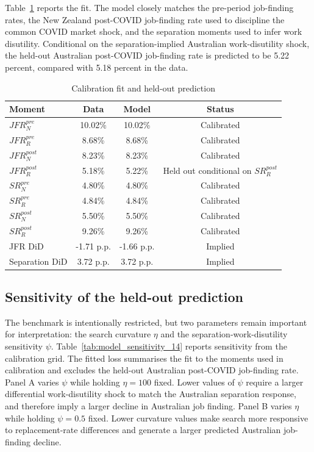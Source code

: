 Table~\ref{tab:model_fit_14} reports the fit. The model closely matches the pre-period job-finding rates, the New Zealand post-COVID job-finding rate used to discipline the common COVID market shock, and the separation moments used to infer work disutility. Conditional on the separation-implied Australian work-disutility shock, the held-out Australian post-COVID job-finding rate is predicted to be 5.22 percent, compared with 5.18 percent in the data.

\begin{table}[htbp]
    \centering
    \caption{Calibration fit and held-out prediction}
    \label{tab:model_fit_14}
    \begin{tabular}{lccc}
        \toprule
        Moment & Data & Model & Status \\
        \midrule
        $JFR_N^{pre}$ & 10.02\% & 10.02\% & Calibrated \\
        $JFR_R^{pre}$ & 8.68\% & 8.68\% & Calibrated \\
        $JFR_N^{post}$ & 8.23\% & 8.23\% & Calibrated \\
        $JFR_R^{post}$ & 5.18\% & 5.22\% & Held out conditional on $SR_R^{post}$ \\
        $SR_N^{pre}$ & 4.80\% & 4.80\% & Calibrated \\
        $SR_R^{pre}$ & 4.84\% & 4.84\% & Calibrated \\
        $SR_N^{post}$ & 5.50\% & 5.50\% & Calibrated \\
        $SR_R^{post}$ & 9.26\% & 9.26\% & Calibrated \\
        \midrule
        JFR DiD & -1.71 p.p. & -1.66 p.p. & Implied \\
        Separation DiD & 3.72 p.p. & 3.72 p.p. & Implied \\
        \bottomrule
    \end{tabular}
\end{table}

\subsection{Sensitivity of the held-out prediction}

The benchmark is intentionally restricted, but two parameters remain important for interpretation: the search curvature $\eta$ and the separation-work-disutility sensitivity $\psi$. Table~\ref{tab:model_sensitivity_14} reports sensitivity from the calibration grid. The fitted loss summarises the fit to the moments used in calibration and excludes the held-out Australian post-COVID job-finding rate. Panel A varies $\psi$ while holding $\eta=100$ fixed. Lower values of $\psi$ require a larger differential work-disutility shock to match the Australian separation response, and therefore imply a larger decline in Australian job finding. Panel B varies $\eta$ while holding $\psi=0.5$ fixed. Lower curvature values make search more responsive to replacement-rate differences and generate a larger predicted Australian job-finding decline.

